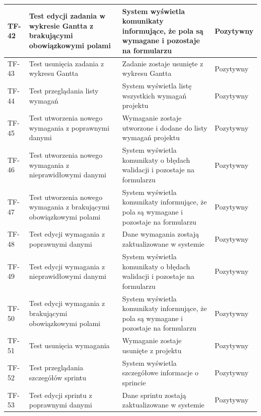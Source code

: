 \begin{longtable}{|p{2cm}|p{6cm}|p{5cm}|p{2.5cm}|}
TF-42 & Test edycji zadania w wykresie Gantta z brakującymi obowiązkowymi polami & System wyświetla komunikaty informujące, że pola są wymagane i pozostaje na formularzu & Pozytywny \\ \hline

TF-43 & Test usunięcia zadania z wykresu Gantta & Zadanie zostaje usunięte z wykresu Gantta & Pozytywny \\ \hline

TF-44 & Test przeglądania listy wymagań & System wyświetla listę wszystkich wymagań projektu & Pozytywny \\ \hline

TF-45 & Test utworzenia nowego wymagania z poprawnymi danymi & Wymaganie zostaje utworzone i dodane do listy wymagań projektu & Pozytywny \\ \hline

TF-46 & Test utworzenia nowego wymagania z nieprawidłowymi danymi & System wyświetla komunikaty o błędach walidacji i pozostaje na formularzu & Pozytywny \\ \hline

TF-47 & Test utworzenia nowego wymagania z brakującymi obowiązkowymi polami & System wyświetla komunikaty informujące, że pola są wymagane i pozostaje na formularzu & Pozytywny \\ \hline

TF-48 & Test edycji wymagania z poprawnymi danymi & Dane wymagania zostają zaktualizowane w systemie & Pozytywny \\ \hline

TF-49 & Test edycji wymagania z nieprawidłowymi danymi & System wyświetla komunikaty o błędach walidacji i pozostaje na formularzu & Pozytywny \\ \hline

TF-50 & Test edycji wymagania z brakującymi obowiązkowymi polami & System wyświetla komunikaty informujące, że pola są wymagane i pozostaje na formularzu & Pozytywny \\ \hline

TF-51 & Test usunięcia wymagania & Wymaganie zostaje usunięte z projektu & Pozytywny \\ \hline

TF-52 & Test przeglądania szczegółów sprintu & System wyświetla szczegółowe informacje o sprincie & Pozytywny \\ \hline

TF-53 & Test edycji sprintu z poprawnymi danymi & Dane sprintu zostają zaktualizowane w systemie & Pozytywny \\ \hline


\end{longtable}
